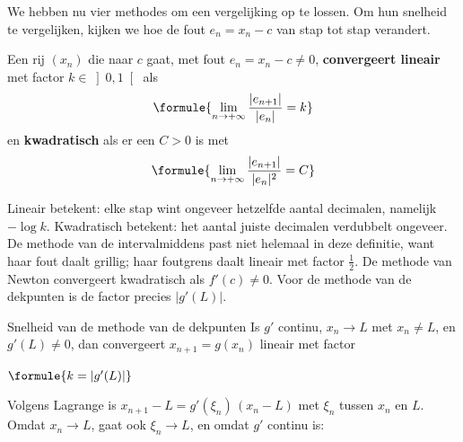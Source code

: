We hebben nu vier methodes om een vergelijking op te lossen. Om hun snelheid te vergelijken, kijken we hoe de fout $e_n = x_n - c$ van stap tot stap verandert.

\begin{theorie}
Een rij $(x_n)$ die naar $c$ gaat, met fout $e_n = x_n - c \neq 0$, \textbf{\textcolor{accent}{convergeert lineair}} met factor $k \in \left]0, 1\right[$ als
\[
\formule{\lim_{n \to +\infty} \frac{|e_{n+1}|}{|e_n|} = k}
\]
en \textbf{\textcolor{accent}{kwadratisch}} als er een $C > 0$ is met
\[
\formule{\lim_{n \to +\infty} \frac{|e_{n+1}|}{|e_n|^2} = C}
\]
\end{theorie}

Lineair betekent: elke stap wint ongeveer hetzelfde aantal decimalen, namelijk $-\log k$. Kwadratisch betekent: het aantal juiste decimalen verdubbelt ongeveer. De methode van de intervalmiddens past niet helemaal in deze definitie, want haar fout daalt grillig; haar foutgrens daalt lineair met factor $\frac12$. De methode van Newton convergeert kwadratisch als $f'(c) \neq 0$. Voor de methode van de dekpunten is de factor precies $|g'(L)|$.

\begin{theorie}
\begin{stelling}{Snelheid van de methode van de dekpunten}
Is $g'$ continu, $x_n \to L$ met $x_n \neq L$, en $g'(L) \neq 0$, dan convergeert $x_{n+1} = g(x_n)$ lineair met factor

\vspace{1mm}
\qquad $\formule{k = |g'(L)|}$
\end{stelling}

\begin{bewijs}
Volgens Lagrange is $x_{n+1} - L = g'(\xi_n)\,(x_n - L)$ met $\xi_n$ tussen $x_n$ en $L$. Omdat $x_n \to L$, gaat ook $\xi_n \to L$, en omdat $g'$ continu is:
\end{bewijs}
\end{theorie}

